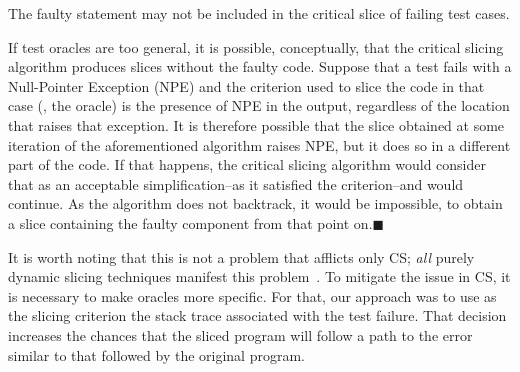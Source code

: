 \documentclass{article}
\begin{document}
\begin{theorem}\label{the:1}
  The faulty statement may not be included in the critical slice of
  failing test cases.
\end{theorem}


If test oracles are too general, it is possible, conceptually, that
the critical slicing algorithm produces slices without the faulty
code. Suppose that a test fails with a Null-Pointer Exception (NPE)
and the criterion used to slice the code in that case (\ie{}, the
oracle) is the presence of NPE in the output, regardless of the
location that raises that exception. It is therefore possible that the
slice obtained at some iteration of the aforementioned algorithm
raises NPE, but it does so in a different part of the code. If that
happens, the critical slicing algorithm would consider that as an
acceptable simplification--as it satisfied the criterion--and would
continue. As the algorithm does not backtrack, it would be impossible,
to obtain a slice containing the faulty component from that point
on.\hfill{\tiny$\blacksquare$}

It is worth noting that this is not a problem that afflicts only CS;
\emph{all} purely dynamic slicing techniques manifest this
problem~\cite{Lin:2018:BDE:3238147.3238163}. To mitigate the issue in
CS, it is necessary to make oracles more specific. For that, our
approach was to use as the slicing criterion the stack trace
associated with the test failure. That decision increases the chances
that the sliced program will follow a path to the error similar to
that followed by the original program. 


\end{document}
